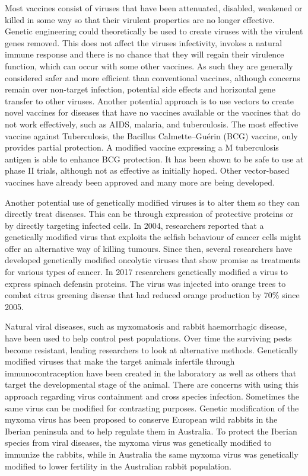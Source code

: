 Most vaccines consist of viruses that have been attenuated, disabled, weakened or killed in some way so that their virulent properties are no longer effective. Genetic engineering could theoretically be used to create viruses with the virulent genes removed. This does not affect the viruses infectivity, invokes a natural immune response and there is no chance that they will regain their virulence function, which can occur with some other vaccines. As such they are generally considered safer and more efficient than conventional vaccines, although concerns remain over non-target infection, potential side effects and horizontal gene transfer to other viruses. Another potential approach is to use vectors to create novel vaccines for diseases that have no vaccines available or the vaccines that do not work effectively, such as AIDS, malaria, and tuberculosis. The most effective vaccine against Tuberculosis, the Bacillus Calmette--Guérin (BCG) vaccine, only provides partial protection. A modified vaccine expressing a M tuberculosis antigen is able to enhance BCG protection. It has been shown to be safe to use at phase II trials, although not as effective as initially hoped. Other vector-based vaccines have already been approved and many more are being developed.

Another potential use of genetically modified viruses is to alter them so they can directly treat diseases. This can be through expression of protective proteins or by directly targeting infected cells. In 2004, researchers reported that a genetically modified virus that exploits the selfish behaviour of cancer cells might offer an alternative way of killing tumours. Since then, several researchers have developed genetically modified oncolytic viruses that show promise as treatments for various types of cancer. In 2017 researchers genetically modified a virus to express spinach defensin proteins. The virus was injected into orange trees to combat citrus greening disease that had reduced orange production by 70\% since 2005.

Natural viral diseases, such as myxomatosis and rabbit haemorrhagic disease, have been used to help control pest populations. Over time the surviving pests become resistant, leading researchers to look at alternative methods. Genetically modified viruses that make the target animals infertile through immunocontraception have been created in the laboratory as well as others that target the developmental stage of the animal. There are concerns with using this approach regarding virus containment and cross species infection. Sometimes the same virus can be modified for contrasting purposes. Genetic modification of the myxoma virus has been proposed to conserve European wild rabbits in the Iberian peninsula and to help regulate them in Australia. To protect the Iberian species from viral diseases, the myxoma virus was genetically modified to immunize the rabbits, while in Australia the same myxoma virus was genetically modified to lower fertility in the Australian rabbit population.

